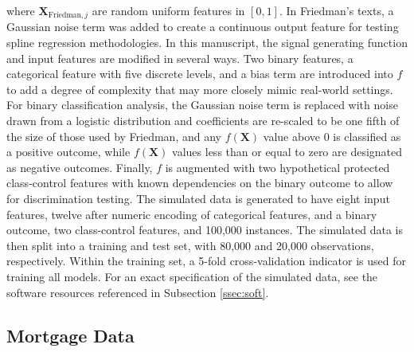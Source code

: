 \documentclass[information,article,submit,moreauthors,pdftex]{definitions/mdpi}
\begin{document}
\noindent where $\mathbf{X}_{\text{Friedman},j}$ are random uniform features in $[0,1]$. In Friedman's texts, a Gaussian noise term was added to create a continuous output feature for testing spline regression methodologies. In this manuscript, the signal generating function and input features are modified in several ways.  Two binary features, a categorical feature with five discrete levels, and a bias term are introduced into $f$ to add a degree of complexity that may more closely mimic real-world settings. 
For binary classification analysis, the Gaussian noise term is replaced with noise drawn from a logistic distribution and coefficients are re-scaled to be one fifth of the size of those used by Friedman, and any $f(\mathbf{X})$ value above 0 is classified as a positive outcome, while $f(\mathbf{X})$ values less than or equal to zero are designated as negative outcomes.  Finally, $f$ is augmented with two hypothetical protected class-control features with known dependencies on the binary outcome to allow for discrimination testing. The simulated data is generated to have eight input features, twelve after numeric encoding of categorical features, and a binary outcome, two class-control features, and 100,000 instances. The simulated data is then split into a training and test set, with 80,000 and 20,000 observations, respectively.  Within the training set, a 5-fold cross-validation indicator is used for training all models. For an exact specification of the simulated data, see the software resources referenced in Subsection \ref{ssec:soft}.


\subsection{Mortgage Data}\label{ssec:mort_data}
\end{document}
